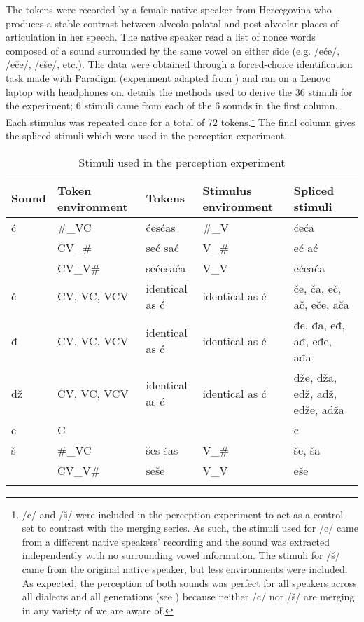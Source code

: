 \documentclass[output=paper,modfonts,newtxmath,hidelinks,]{langscibook}
\begin{document}
The tokens were recorded by a female native speaker from Hercegovina who produces a stable contrast between alveolo-palatal and post-alveolar places of articulation in her speech. The native speaker read a list of nonce words composed of a  sound surrounded by the same vowel on either side (e.g. /eće/, /eče/, /eše/, etc.). The data were obtained through a forced-choice identification task made with Paradigm (experiment adapted from \citealt{Lee-Jongman2016}) and ran on a Lenovo laptop with headphones on.  details the methods used to derive the 36 stimuli for the experiment; 6 stimuli came from each of the 6 sounds in the first column. Each stimulus was repeated once for a total of 72 tokens.\footnote{/c/ and /š/ were included in the perception experiment to act as a control set to contrast with the merging series. As such, the stimuli used for /c/ came from a different native speakers' recording and the sound was extracted independently with no surrounding vowel information. The stimuli for /š/ came from the original native speaker, but less environments were included. As expected, the perception of both sounds was perfect for all speakers across all dialects and all generations (see ) because neither /c/ nor /š/ are merging in any variety of  we are aware of.} The final column gives the spliced stimuli which were used in the perception experiment.

\begin{table}
\begin{tabularx}{\textwidth}{llXQQ}
\lsptoprule
 \textbf{Sound} &  \textbf{Token environment} &  \textbf{Tokens} &  \textbf{Stimulus environment} &  \textbf{Spliced stimuli}\\
\midrule
{ć} & \#\_VC & {ćes}\newline ćas & \#\_V & {će}\newline ća\\
& CV\_\# & {seć} \newline sać & V\_\# & {eć} \newline  ać\\

\tablevspace 
& CV\_V\# & {seće}\newline saća & V\_V & {eće}\newline aća\\

\tablevspace
č & CV, VC, VCV & identical as ć & identical as ć & če, ča, eč, ač, eče, ača\\
{đ} & CV, VC, VCV & identical as ć & identical as ć & đe, đa, eđ, ađ, eđe, ađa\\
dž & CV, VC, VCV & identical as ć & identical as ć & dže, dža, edž, adž, edže, adža\\
c & C &  &  & c\\
{š} & \#\_VC & {šes} \newline šas & V\_\# & še, ša\\
& CV\_V\# & seše & V\_V & eše\\
\lspbottomrule
\end{tabularx}
\caption{\label{tab:mihajlovic:3} Stimuli used in the perception experiment}
\end{table}
\end{document}

